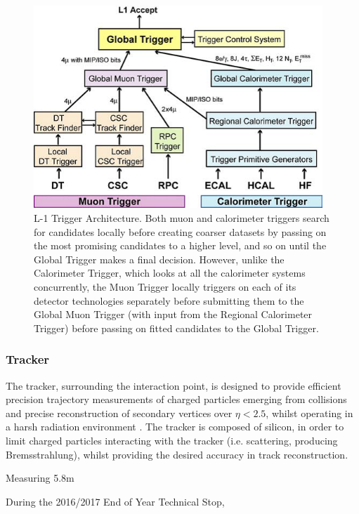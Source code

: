\begin{figure}[htbp]
\begin{center}
\includegraphics[width=0.97\textwidth]{figs/cms/trigger.png}
\caption{L-1 Trigger Architecture. Both muon and calorimeter triggers search for candidates locally before creating coarser datasets by passing on the most promising candidates to a higher level, and so on until the Global Trigger makes a final decision. However, unlike the Calorimeter Trigger, which looks at all the calorimeter systems concurrently, the Muon Trigger locally triggers on each of its detector technologies separately before submitting them to the Global Muon Trigger (with input from the Regional Calorimeter Trigger) before passing on fitted candidates to the Global Trigger.}
\label{fig:trigger}
\end{center}
\end{figure}

\subsubsection{Tracker}
The tracker, surrounding the interaction point, is designed to provide efficient precision trajectory measurements of charged particles emerging from collisions and precise reconstruction of secondary vertices over $\eta < 2.5$, whilst operating in a harsh radiation environment .
The tracker is composed of silicon, in order to limit charged particles interacting with the tracker (i.e. scattering, producing Bremsstrahlung), whilst providing the desired accuracy in track reconstruction\cite{oldcms}.

Measuring 5.8m 

During the 2016/2017 End of Year Technical Stop, 
